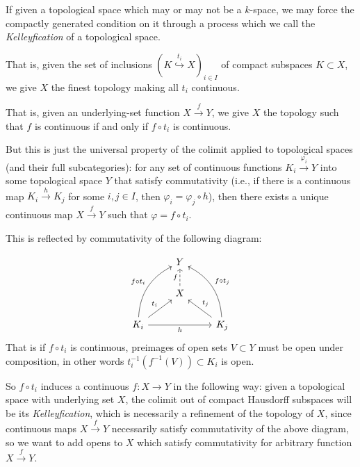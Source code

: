 \documentclass[12pt,a4paper]{article}
\begin{document}
If given a topological space which may or may not be a $k$-space, we may force the compactly generated condition on it through a process which we call the \emph{Kelleyfication} of a topological space.

That is, given the set of inclusions $(K \stackrel{t_i}{\hookrightarrow} X)_{i \in I}$ of  compact subspaces $K\subset X$, we give $X$ the finest topology making all $t_i$ continuous. 

That is, given an underlying-set function $X \stackrel{f}{\to} Y$, we give $X$ the topology such that $f$ is continuous if and only if $f \circ t_i$ is continuous. 

But this is just the universal property of the colimit applied to topological spaces (and their full subcategories): for any set of continuous functions  $K_i \stackrel{\varphi_i}{\to}Y$ into some topological space $Y$ that satisfy commutativity (i.e., if there is a continuous map $K_i \stackrel{h}{\to} K_j $ for some $i, j \in I$, then $\varphi_i = \varphi_j \circ h$), then there exists a unique continuous map $X \stackrel{f}{\to}Y$ such that $\varphi = f \circ t_i$. 

This is reflected by commutativity of the following diagram:

\[\begin{tikzcd}
	& Y \\
	& X \\
	{K_i} && {K_j}
	\arrow["f", dashed, from=2-2, to=1-2]
	\arrow["{f \circ t_i}", bend left,  from=3-1, to=1-2]
	\arrow["{t_i}", from=3-1, to=2-2]
	\arrow["h"', from=3-1, to=3-3]
	\arrow["{f \circ t_j}"', bend right, from=3-3,  to=1-2]
	\arrow["{t_j}"', from=3-3, to=2-2]
\end{tikzcd}\]
That is if $f \circ t_i$ is continuous, preimages of open sets $V \subset Y$ must be open under composition, in other words $t_i^{-1}(f^{-1}(V)) \subset K_i$ is open. 

So $f \circ t_i$ induces a continuous $f: X \to Y$ in the following way: given a topological space with underlying set  $X$, the colimit out of compact Hausdorff subspaces will be its \emph{Kelleyfication}, which is necessarily a refinement of the topology of $X$, since continuous maps $X \stackrel{f}{\to}Y$ necessarily satisfy commutativity of the above diagram, so we want to add opens to $X$ which satisfy commutativity for arbitrary function $X \stackrel{f}{\to}Y$. 

\end{document}
